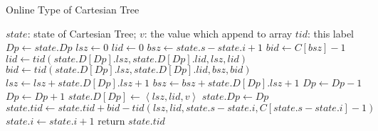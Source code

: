 \begin{algorithm*}[!thb]
  \caption{Online Type of Cartesian Tree}
  \label{alg:cartesian-encode-offline}
  \begin{algorithmic}[1]
  \Require
      $\mathit{state}$: state of Cartesian Tree;
      $v$: the value which append to array
  \Ensure
      $\mathit{tid}$: this label
  \State $\textit{Dp} \gets \textit{state}.\textit{Dp}$
  \State $\textit{lsz} \gets 0$ 
  \State $\textit{lid} \gets 0$
  \State $\textit{bsz} \gets \textit{state}.\textit{s} - \textit{state}.\textit{i} + 1$
  \State $\textit{bid} \gets C[\textit{bsz}] - 1$
    \State $\textit{lid} \gets \textit{tid}(\textit{state}.D[\textit{Dp}].\textit{lsz}, \textit{state}.D[\textit{Dp}].\textit{lid}, \textit{lsz}, \textit{lid})$
    \State $\textit{bid} \gets \textit{tid}(\textit{state}.D[\textit{Dp}].\textit{lsz}, \textit{state}.D[\textit{Dp}].\textit{lid}, \textit{bsz}, \textit{bid})$
    \State $\textit{lsz} \gets \textit{lsz} + \textit{state}.D[\textit{Dp}].\textit{lsz}+1$
    \State $\textit{bsz} \gets \textit{bsz} + \textit{state}.D[\textit{Dp}].\textit{lsz}+1$
    \State $\textit{Dp} \gets \textit{Dp} - 1$
  \EndWhile
  \State $\textit{Dp} \gets \textit{Dp} + 1$
  \State $\textit{state}.D[\textit{Dp}] \gets \left \langle \textit{lsz}, \textit{lid}, \textit{v} \right \rangle$
  \State $\textit{state}.\textit{Dp} \gets \textit{Dp}$
  \State $\textit{state}.\textit{tid} \gets \textit{state}.\textit{tid} + \textit{bid} - \textit{tid}(\textit{lsz}, \textit{lid}, \textit{state}.s-\textit{state}.i, C[\textit{state}.s-\textit{state}.i]-1)$
  \State $\textit{state}.i \gets \textit{state}.i + 1$
  \State return $\textit{state}.\textit{tid}$
  \end{algorithmic}
\end{algorithm*}